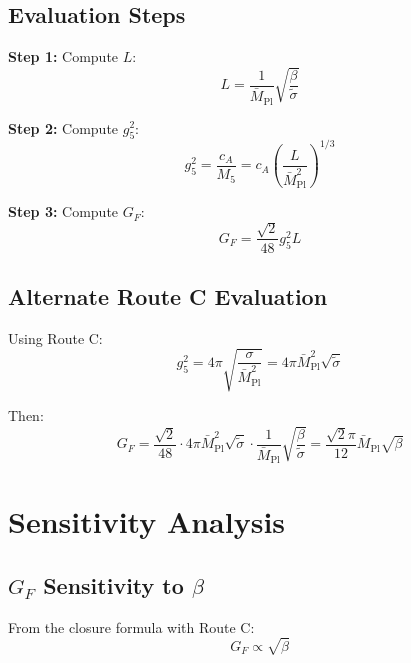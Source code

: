 \documentclass[11pt,a4paper]{article}
\begin{document}
\subsection{Evaluation Steps}
\label{app:eval-steps}

\textbf{Step 1:} Compute $L$:
\begin{equation}
\label{eq:eval-step1}
L = \frac{1}{\bar{M}_{\text{Pl}}} \sqrt{\frac{\beta}{\tilde{\sigma}}}
\end{equation}

\textbf{Step 2:} Compute $g_5^2$:
\begin{equation}
\label{eq:eval-step2}
g_5^2 = \frac{c_A}{M_5} = c_A \left(\frac{L}{\bar{M}_{\text{Pl}}^2}\right)^{1/3}
\end{equation}

\textbf{Step 3:} Compute $G_F$:
\begin{equation}
\label{eq:eval-step3}
G_F = \frac{\sqrt{2}}{48} g_5^2 L
\end{equation}

\subsection{Alternate Route C Evaluation}
\label{app:route-c-eval}

Using Route C:
\begin{equation}
\label{eq:route-c-g5}
g_5^2 = 4\pi \sqrt{\frac{\sigma}{\bar{M}_{\text{Pl}}^2}} = 4\pi \bar{M}_{\text{Pl}}^2 \sqrt{\tilde{\sigma}}
\end{equation}

Then:
\begin{equation}
\label{eq:route-c-gf}
G_F = \frac{\sqrt{2}}{48} \cdot 4\pi \bar{M}_{\text{Pl}}^2 \sqrt{\tilde{\sigma}} \cdot \frac{1}{\bar{M}_{\text{Pl}}} \sqrt{\frac{\beta}{\tilde{\sigma}}}
= \frac{\sqrt{2}\pi}{12} \bar{M}_{\text{Pl}} \sqrt{\beta}
\end{equation}

\section{Sensitivity Analysis}
\label{app:sensitivity}

\subsection{$G_F$ Sensitivity to $\beta$}
\label{app:gf-beta-sens}

From the closure formula with Route C:
\begin{equation}
\label{eq:gf-beta-form}
G_F \propto \sqrt{\beta}
\end{equation}
\end{document}
